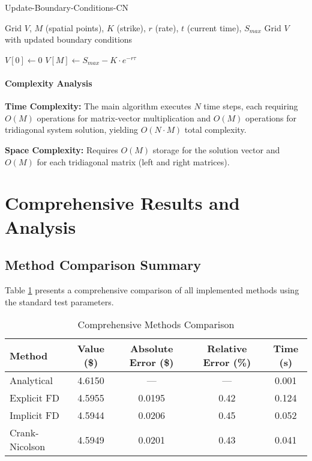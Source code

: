 \documentclass[12pt,a4paper]{article}
\numberwithin{algorithm}{subsection}
\begin{document}
\begin{algorithm}[H]
\caption{Update-Boundary-Conditions-CN}
\begin{algorithmic}[1]
\REQUIRE Grid $V$, $M$ (spatial points), $K$ (strike), $r$ (rate), $t$ (current time), $S_{max}$
\ENSURE Grid $V$ with updated boundary conditions

\STATE $V[0] \leftarrow 0$ 
\STATE $V[M] \leftarrow S_{max} - K \cdot e^{-r\tau}$ 
\end{algorithmic}
\end{algorithm}

\paragraph{Complexity Analysis}

\textbf{Time Complexity:} The main algorithm executes $N$ time steps, each requiring $O(M)$ operations for matrix-vector multiplication and $O(M)$ operations for tridiagonal system solution, yielding $O(N \cdot M)$ total complexity.

\textbf{Space Complexity:} Requires $O(M)$ storage for the solution vector and $O(M)$ for each tridiagonal matrix (left and right matrices).

\section{Comprehensive Results and Analysis}

\subsection{Method Comparison Summary}

Table \ref{tab:comparison} presents a comprehensive comparison of all implemented methods using the standard test parameters.

\begin{table}[H]
\centering
\caption{Comprehensive Methods Comparison}
\label{tab:comparison}
\begin{tabular}{lcccc}
\toprule
\textbf{Method} & \textbf{Value (\$)} & \textbf{Absolute Error (\$)} & \textbf{Relative Error (\%)} & \textbf{Time (s)} \\
\midrule
Analytical & 4.6150 & --- & --- & 0.001 \\
Explicit FD & 4.5955 & 0.0195 & 0.42 & 0.124 \\
Implicit FD & 4.5944 & 0.0206 & 0.45 & 0.052 \\
Crank-Nicolson & 4.5949 & 0.0201 & 0.43 & 0.041 \\
\bottomrule
\end{tabular}
\end{table}
\end{document}
